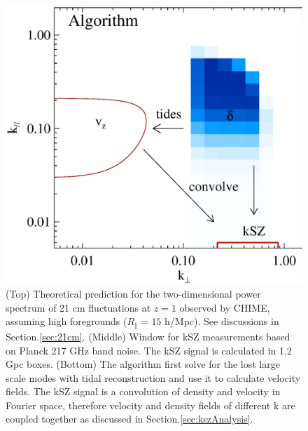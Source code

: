 \begin{figure}[tbp]
\begin{minipage}[t]{\linewidth}
\includegraphics[width=\textwidth]{figure/demo_convolution.eps}
\vspace{-0.6cm}
\end{minipage}
\caption{
(Top) Theoretical prediction for the two-dimensional power spectrum of 21 cm fluctuations at $z=1$ observed by CHIME, assuming high foregrounds ($R_\parallel=15$ h/Mpc). See discussions in Section.\ref{sec:21cm}. (Middle) Window for kSZ measurements based on Planck 217 GHz band noise. The kSZ signal is calculated in 1.2 Gpc boxes.
(Bottom) The algorithm first solve for the lost large scale modes 
with tidal reconstruction 
and use it to calculate velocity fields.   
The kSZ signal is a convolution of density and velocity in Fourier space, 
therefore velocity and density fields of different k are coupled together 
as discussed in Section.\ref{sec:kszAnalysis}. 
}
\end{figure}
